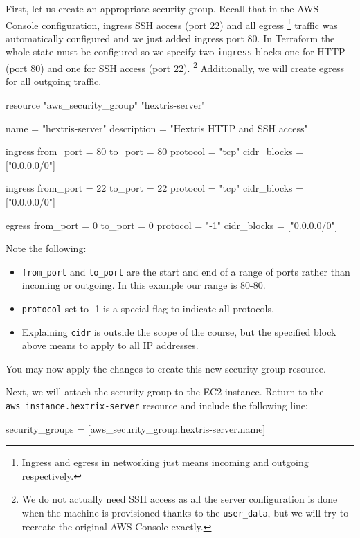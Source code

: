 \documentclass{csse4400}
\begin{document}
First, let us create an appropriate security group.
Recall that in the AWS Console configuration,
ingress SSH access (port 22) and all egress%
\footnote{Ingress and egress in networking just means incoming and outgoing respectively.}
traffic was automatically configured and we just added ingress port 80.
In Terraform the whole state must be configured so we specify two
\texttt{ingress} blocks one for HTTP (port 80) and one for SSH access (port 22).%
\footnote{We do not actually need SSH access as all the server configuration is done when the machine is provisioned thanks to the \texttt{user\_data},
but we will try to recreate the original AWS Console exactly.}
Additionally, we will create egress for all outgoing traffic.

\begin{code}[language=terraform,numbers=none]{}
resource "aws_security_group" "hextris-server" {
  name = "hextris-server"
  description = "Hextris HTTP and SSH access"

  ingress {
    from_port = 80
    to_port = 80
    protocol = "tcp"
    cidr_blocks = ["0.0.0.0/0"]
  }

  ingress {
    from_port = 22
    to_port = 22
    protocol = "tcp"
    cidr_blocks = ["0.0.0.0/0"]
  }

  egress {
    from_port = 0
    to_port = 0
    protocol = "-1"
    cidr_blocks = ["0.0.0.0/0"]
  }
}
\end{code}

Note the following:
\begin{itemize}
  \item \texttt{from\_port} and \texttt{to\_port} are the start and end of a range of ports rather than incoming or outgoing. In this example our range is 80-80.
  \item \texttt{protocol} set to -1 is a special flag to indicate all protocols.
  \item Explaining \texttt{cidr} is outside the scope of the course, but the specified block above means to apply to all IP addresses.
\end{itemize}

You may now apply the changes to create this new security group resource.

Next, we will attach the security group to the EC2 instance.
Return to the \texttt{aws\_instance.hextrix-server} resource
and include the following line:

\begin{code}[language=terraform,numbers=none]{}
security_groups = [aws_security_group.hextris-server.name]
\end{code}
\end{document}
